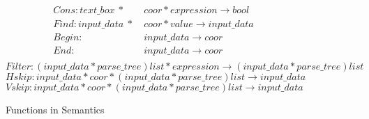 \begin{figure*}[th]
\centering
\small
\begin{align*}
  Cons:text\_box~*&~coor*expression \rightarrow bool \\
  Find:input\_data~*&~coor*value \rightarrow input\_data \\
  Begin:&~input\_data \rightarrow coor \\
  End:&~input\_data \rightarrow coor \\
\end{align*}
\vspace{-9 mm}
\[
  Filter:(input\_data*parse\_tree)list*expression \rightarrow (input\_data*parse\_tree)list 
\]
\[
  Hskip:input\_data*coor*(input\_data*parse\_tree)list \rightarrow input\_data 
\]
\[
  Vskip:input\_data*coor*(input\_data*parse\_tree)list \rightarrow input\_data 
\]
\caption{Functions in Semantics}\label{fig:funseman}
\end{figure*}

